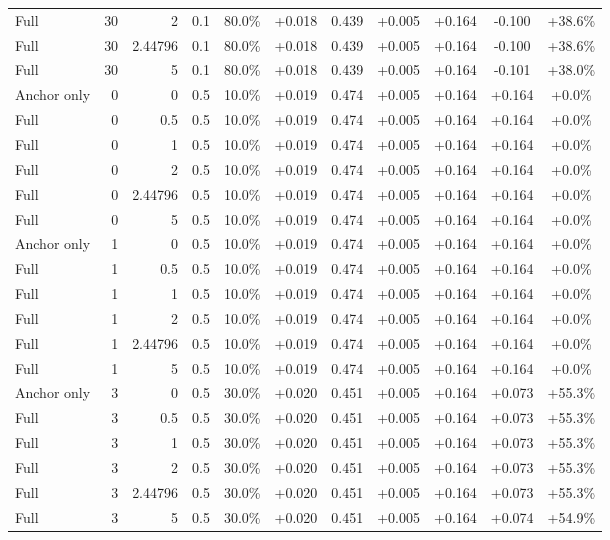 \begin{table}[htbp]
\begin{tabular}{lrrrccccccc}
Full & 30 & 2 & 0.1 & 80.0\% & +0.018 & 0.439 & +0.005 & +0.164 & -0.100 & +38.6\% \\
Full & 30 & 2.44796 & 0.1 & 80.0\% & +0.018 & 0.439 & +0.005 & +0.164 & -0.100 & +38.6\% \\
Full & 30 & 5 & 0.1 & 80.0\% & +0.018 & 0.439 & +0.005 & +0.164 & -0.101 & +38.0\% \\
Anchor only & 0 & 0 & 0.5 & 10.0\% & +0.019 & 0.474 & +0.005 & +0.164 & +0.164 & +0.0\% \\
Full & 0 & 0.5 & 0.5 & 10.0\% & +0.019 & 0.474 & +0.005 & +0.164 & +0.164 & +0.0\% \\
Full & 0 & 1 & 0.5 & 10.0\% & +0.019 & 0.474 & +0.005 & +0.164 & +0.164 & +0.0\% \\
Full & 0 & 2 & 0.5 & 10.0\% & +0.019 & 0.474 & +0.005 & +0.164 & +0.164 & +0.0\% \\
Full & 0 & 2.44796 & 0.5 & 10.0\% & +0.019 & 0.474 & +0.005 & +0.164 & +0.164 & +0.0\% \\
Full & 0 & 5 & 0.5 & 10.0\% & +0.019 & 0.474 & +0.005 & +0.164 & +0.164 & +0.0\% \\
Anchor only & 1 & 0 & 0.5 & 10.0\% & +0.019 & 0.474 & +0.005 & +0.164 & +0.164 & +0.0\% \\
Full & 1 & 0.5 & 0.5 & 10.0\% & +0.019 & 0.474 & +0.005 & +0.164 & +0.164 & +0.0\% \\
Full & 1 & 1 & 0.5 & 10.0\% & +0.019 & 0.474 & +0.005 & +0.164 & +0.164 & +0.0\% \\
Full & 1 & 2 & 0.5 & 10.0\% & +0.019 & 0.474 & +0.005 & +0.164 & +0.164 & +0.0\% \\
Full & 1 & 2.44796 & 0.5 & 10.0\% & +0.019 & 0.474 & +0.005 & +0.164 & +0.164 & +0.0\% \\
Full & 1 & 5 & 0.5 & 10.0\% & +0.019 & 0.474 & +0.005 & +0.164 & +0.164 & +0.0\% \\
Anchor only & 3 & 0 & 0.5 & 30.0\% & +0.020 & 0.451 & +0.005 & +0.164 & +0.073 & +55.3\% \\
Full & 3 & 0.5 & 0.5 & 30.0\% & +0.020 & 0.451 & +0.005 & +0.164 & +0.073 & +55.3\% \\
Full & 3 & 1 & 0.5 & 30.0\% & +0.020 & 0.451 & +0.005 & +0.164 & +0.073 & +55.3\% \\
Full & 3 & 2 & 0.5 & 30.0\% & +0.020 & 0.451 & +0.005 & +0.164 & +0.073 & +55.3\% \\
Full & 3 & 2.44796 & 0.5 & 30.0\% & +0.020 & 0.451 & +0.005 & +0.164 & +0.073 & +55.3\% \\
Full & 3 & 5 & 0.5 & 30.0\% & +0.020 & 0.451 & +0.005 & +0.164 & +0.074 & +54.9\% \\

\end{tabular}
\end{table}
